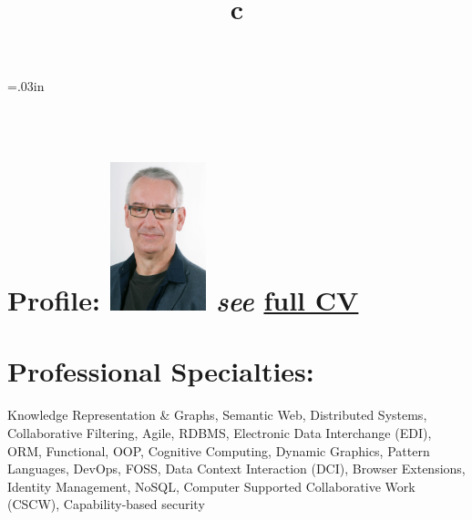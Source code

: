 \documentclass[line,margin,hidelinks]{res}
\begin{document}


\begin{resume}

\sectionskip=.03in

\begin{format}
\title{c}\\
\end{format}


\section{Profile:
  \newline   \newline
  \includegraphics[width=1.1in]{smurp_smile_color.eps}
  \footnotesize{\textit{see} \href{\cvUrl}{full CV}}
}



\section{Professional Specialties:}
\begin{par}
Knowledge Representation \& Graphs,
Semantic Web,
Distributed Systems,
Collaborative Filtering,
Agile,
RDBMS,
Electronic Data Interchange (EDI),
ORM,
Functional,
OOP,
Cognitive Computing,
Dynamic Graphics,
Pattern Languages,
DevOps,
FOSS,
Data Context Interaction (DCI),
Browser Extensions,
Identity Management,
NoSQL,
Computer Supported Collaborative Work (CSCW),
Capability-based security
\end{par}


\end{resume}
\end{document}
